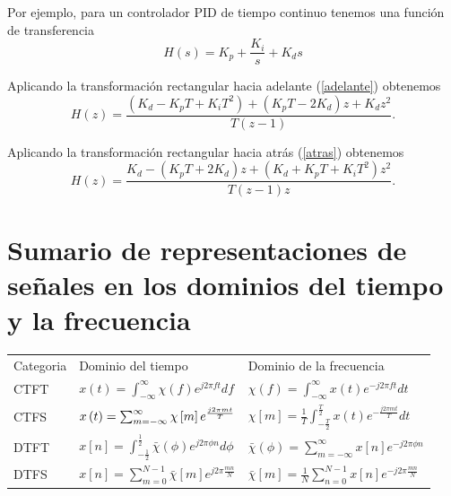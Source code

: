 Por ejemplo, para un controlador PID de tiempo continuo tenemos una funci\'{o}n de transferencia
\begin{equation}
        H(s) = K_{p} + \frac{K_{i}}{s} + K_{d} s
\end{equation}

Aplicando la transformaci\'{o}n rectangular hacia adelante (\ref{adelante}) obtenemos
\begin{equation}
        H(z) = \frac{(K_{d} - K_{p} T + K_{i} T^{2}) +
                        (K_{p} T - 2 K_{d}) z + K_{d} z^2}
                    {T (z - 1)}.
\end{equation}

Aplicando la transformaci\'{o}n rectangular hacia atr\'{a}s (\ref{atras}) obtenemos
\begin{equation}
        H(z) = \frac{K_{d} -
                        (K_{p} T + 2 K_{d}) z + (K_{d} + K_{p} T + K_{i} T^{2}) z^2}
                    {T (z - 1) z}.
\end{equation}

\section{Sumario de representaciones de se\~{n}ales en los dominios del tiempo y la frecuencia}

\begin{tabular}{lll}
Categoria & Dominio del tiempo & Dominio de la frecuencia \\ 
CTFT & $x\left( t\right) =\int_{-\infty }^{\infty }\chi \left( f\right)
e^{j2\pi ft}df$ & $\chi \left( f\right) =\int_{-\infty }^{\infty }x\left(
t\right) e^{-j2\pi ft}dt$ \\ 
CTFS & $x\left( t\right) =\sum_{m=-\infty }^{\infty }\chi \left[ m\right] e^{%
\frac{j2\pi mt}{T}}$ & $\chi \left[ m\right] =\frac{1}{T}\int_{-\frac{T}{2%
}}^{\frac{T}{2}}x\left( t\right) e^{-\frac{j2\pi mt}{T}}dt$ \\ 
DTFT & $x\left[ n\right] =\int_{-\frac{1}{2}}^{\frac{1}{2}}\bar{\chi}%
\left( \phi \right) e^{j2\pi \phi n}d\phi $ & $\bar{\chi}\left( \phi \right)
=\sum_{m=-\infty }^{\infty }x\left[ n\right] e^{-j2\pi \phi n}$ \\ 
DTFS & $x\left[ n\right] =\sum_{m=0}^{N-1}\bar{\chi}\left[ m\right] e^{j2\pi 
\frac{mn}{N}}$ & $\bar{\chi}\left[ m\right] =\frac{1}{N}\sum_{n=0}^{N-1}x%
\left[ n\right] e^{-j2\pi \frac{mn}{N}}$%
\end{tabular}




